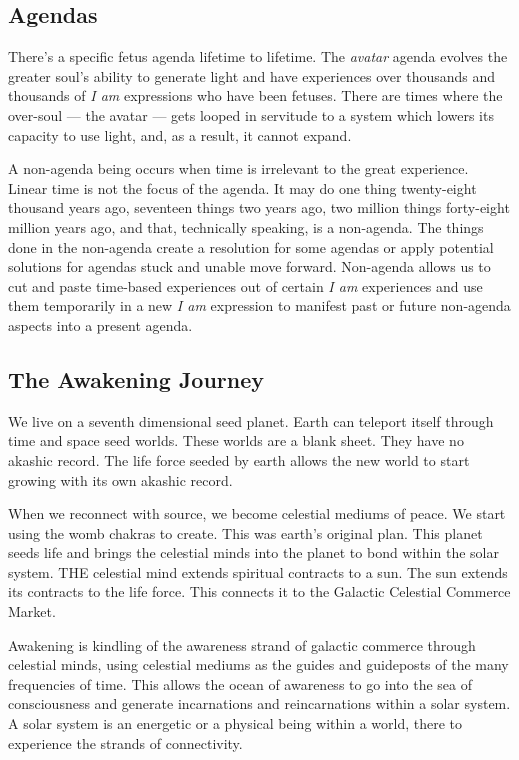 \subsection{Agendas}\label{agendas}

There's a specific fetus agenda lifetime to lifetime. The \emph{avatar}
agenda evolves the greater soul's ability to generate light and have
experiences over thousands and thousands of \emph{I am} expressions who
have been fetuses. There are times where the over-soul --- the avatar
--- gets looped in servitude to a system which lowers its capacity to
use light, and, as a result, it cannot expand.

A non-agenda being occurs when time is irrelevant to the great
experience. Linear time is not the focus of the agenda. It may do one
thing twenty-eight thousand years ago, seventeen things two years ago,
two million things forty-eight million years ago, and that, technically
speaking, is a non-agenda. The things done in the non-agenda create a
resolution for some agendas or apply potential solutions for agendas
stuck and unable move forward. Non-agenda allows us to cut and paste
time-based experiences out of certain \emph{I am} experiences and use
them temporarily in a new \emph{I am} expression to manifest past or
future non-agenda aspects into a present agenda.

\subsection{The Awakening Journey}\label{the-awakening-journey}

We live on a seventh dimensional seed planet. Earth can teleport itself
through time and space seed worlds. These worlds are a blank sheet. They
have no akashic record. The life force seeded by earth allows the new
world to start growing with its own akashic record.

When we reconnect with source, we become celestial mediums of peace. We
start using the womb chakras to create. This was earth's original plan.
This planet seeds life and brings the celestial minds into the planet to
bond within the solar system. THE celestial mind extends spiritual
contracts to a sun. The sun extends its contracts to the life force.
This connects it to the Galactic Celestial Commerce Market.

Awakening is kindling of the awareness strand of galactic commerce
through celestial minds, using celestial mediums as the guides and
guideposts of the many frequencies of time. This allows the ocean of
awareness to go into the sea of consciousness and generate incarnations
and reincarnations within a solar system. A solar system is an energetic
or a physical being within a world, there to experience the strands of
connectivity.

